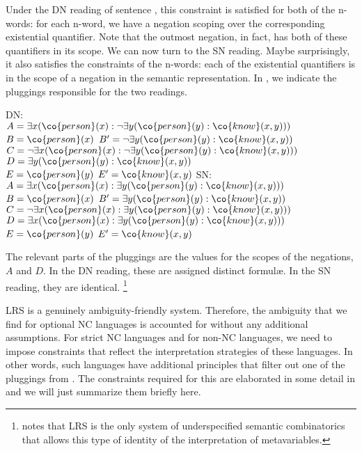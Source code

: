 \documentclass[output=paper]{langsci/langscibook}
\begin{document}
Under the DN reading of sentence , this constraint is satisfied for both of the n-words: for each n-word, we have a negation scoping over the corresponding existential quantifier. Note that the outmost negation, in fact, has both of these quantifiers in its scope. We can now turn to the SN reading. Maybe surprisingly, it also satisfies the constraints of the n-words: each of the existential quantifiers is in the scope of a negation in the semantic representation. In , we indicate the pluggings responsible for the two readings.

\ea \label{personne-personne-plug}
\begin{xlist}
\ex DN:\label{pers-pers-DN}\\
$A = \exists x (\co{person}(x) : \lnot \exists y (\co{person}(y) : \co{know}(x,y)))$\\
$B = \co{person}(x)$ \qquad 
$B' = \lnot \exists y (\co{person}(y) : \co{know}(x,y))$\\
$C = \lnot \exists x (\co{person}(x) : \lnot \exists y (\co{person}(y) : \co{know}(x,y)))$\\
$D = \exists y (\co{person}(y) : \co{know}(x,y))$\\
$E = \co{person}(y)$ \qquad 
$E' = \co{know}(x,y)$
\ex SN:\label{pers-pers-SN}\\
$A = \exists x (\co{person}(x) : \exists y (\co{person}(y) : \co{know}(x,y)))$\\
$B = \co{person}(x)$ \qquad 
$B' = \exists y (\co{person}(y) : \co{know}(x,y))$\\
$C = \lnot \exists x (\co{person}(x) : \exists y (\co{person}(y) : \co{know}(x,y)))$\\
$D = \exists x (\co{person}(x) : \exists y (\co{person}(y) : \co{know}(x,y)))$\\
$E = \co{person}(y)$ \qquad 
$E' = \co{know}(x,y)$
\end{xlist}
\z 

The relevant parts of the pluggings are the values for the scopes of the negations, $A$ and $D$. In the DN reading, these are assigned distinct formul\ae. In the SN reading, they are identical.%
\footnote{\citet{Egg:10} notes that
LRS is the only system of underspecified semantic combinatorics that allows this type of identity of the interpretation of metavariables. %
}

LRS is a genuinely ambiguity-friendly system. Therefore, the
ambiguity that we find for optional NC languages is accounted for without any additional assumptions. 
For strict NC languages and for non-NC languages, we need to impose constraints that reflect the interpretation strategies of these languages. 
In other words, such languages have additional principles that filter out one of the pluggings from . 
The constraints required for this are elaborated in some detail in \citet{Richter:Sailer:06} and we will just summarize them briefly here.
\end{document}
